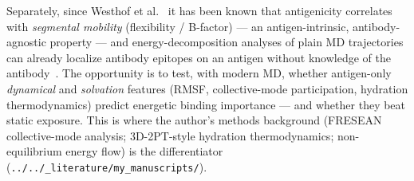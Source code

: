 Separately, since Westhof et al.~\cite{westhof1984} it has been known that antigenicity correlates
with \emph{segmental mobility} (flexibility / B-factor) --- an antigen-intrinsic, antibody-agnostic
property --- and energy-decomposition analyses of plain MD trajectories can already localize
antibody epitopes on an antigen without knowledge of the antibody~\cite{serapian2020}. The
opportunity is to test, with modern MD, whether antigen-only \emph{dynamical} and \emph{solvation}
features (RMSF, collective-mode participation, hydration thermodynamics) predict energetic binding
importance --- and whether they beat static exposure. This is where the author's methods background
(FRESEAN collective-mode analysis; 3D-2PT-style hydration thermodynamics; non-equilibrium energy
flow) is the differentiator (\texttt{../../\_literature/my\_manuscripts/}).
